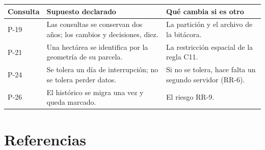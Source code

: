 \documentclass[11pt,letterpaper]{article}
\newcommand{\cab}[1]{\textbf{\rmfamily #1}}
\begin{document}
\begin{center}
\small
\renewcommand{\arraystretch}{1.22}
\begin{tabularx}{\textwidth}{@{}L{1.2cm} L{6.6cm} Y@{}}
\toprule
\cab{Consulta} & \cab{Supuesto declarado} & \cab{Qué cambia si es otro} \\
\midrule
P-19 & Las consultas se conservan dos años; los cambios y decisiones, diez. & La partición y el archivo de la bitácora. \\
P-21 & Una hectárea se identifica por la geometría de su parcela. & La restricción espacial de la regla C11. \\
P-24 & Se tolera un día de interrupción; no se tolera perder datos. & Si no se tolera, hace falta un segundo servidor (RR-6). \\
P-26 & El histórico se migra una vez y queda marcado. & El riesgo RR-9. \\
\bottomrule
\end{tabularx}
\end{center}

\section*{Referencias}
\end{document}

